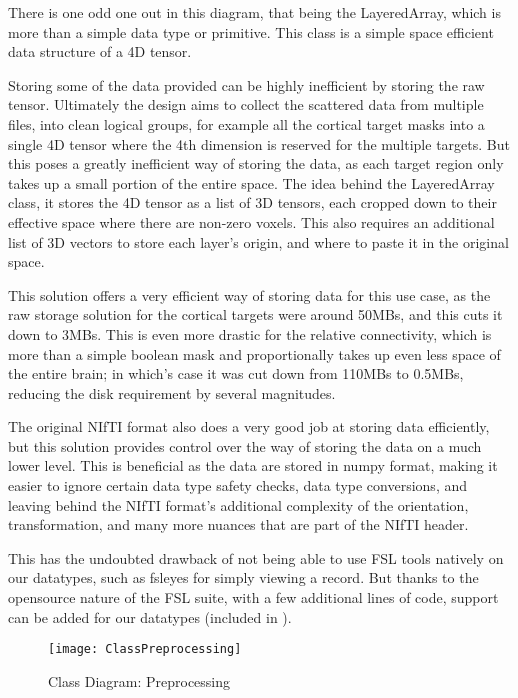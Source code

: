 There is one odd one out in this diagram, that being the LayeredArray, which is more than a simple data type or primitive. This class is a simple space efficient data structure of a 4D tensor.\par
Storing some of the data provided can be highly inefficient by storing the raw tensor. Ultimately the design aims to collect the scattered data from multiple files, into clean logical groups, for example all the cortical target masks into a single 4D tensor where the 4th dimension is reserved for the multiple targets. But this poses a greatly inefficient way of storing the data, as each target region only takes up a small portion of the entire space. The idea behind the LayeredArray class, it stores the 4D tensor as a list of 3D tensors, each cropped down to their effective space where there are non-zero voxels. This also requires an additional list of 3D vectors to store each layer's origin, and where to paste it in the original space.\par
This solution offers a very efficient way of storing data for this use case, as the raw storage solution for the cortical targets were around 50MBs, and this cuts it down to 3MBs. This is even more drastic for the relative connectivity, which is more than a simple boolean mask and proportionally takes up even less space of the entire brain; in which's case it was cut down from 110MBs to 0.5MBs, reducing the disk requirement by several magnitudes.\par
The original \ac{NIfTI} format also does a very good job at storing data efficiently, but this solution provides control over the way of storing the data on a much lower level. This is beneficial as the data are stored in numpy format, making it easier to ignore certain data type safety checks, data type conversions, and leaving behind the \ac{NIfTI} format's additional complexity of the orientation, transformation, and many more nuances that are part of the \ac{NIfTI} header.\par
This has the undoubted drawback of not being able to use \ac{FSL} tools natively on our datatypes, such as fsleyes for simply viewing a record. But thanks to the opensource nature of the \ac{FSL} suite, with a few additional lines of code, support can be added for our datatypes (included in ).

\begin{figure}[H]
\centering
\texttt{[image: ClassPreprocessing]}
\caption{Class Diagram: Preprocessing}
\end{figure}

